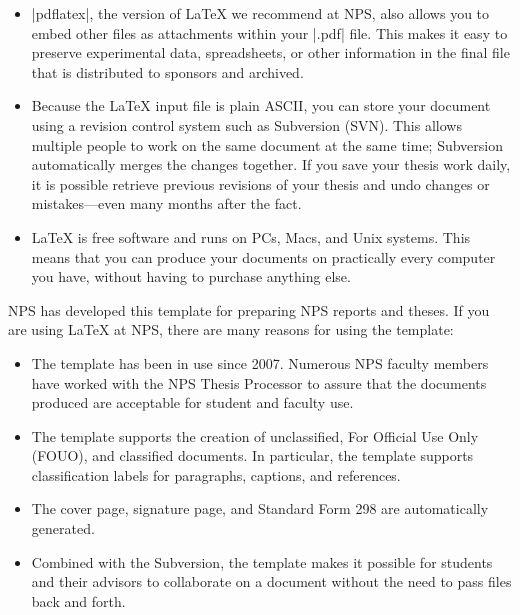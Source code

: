 \begin{itemize}
\item |pdflatex|, the version of \LaTeX{} we recommend at NPS, also allows you
  to embed other files as attachments within your |.pdf| file. This makes it
  easy to preserve  experimental data, spreadsheets, or other information in
  the final file that is distributed to sponsors and archived. 

\item Because the \LaTeX{} input file is plain ASCII, you can store your
  document using a revision control system such as Subversion
  (SVN)\cite{subversion}. This allows multiple people to work on the same
  document at the same time; Subversion automatically merges the changes
  together.  If you save your thesis work daily, it is possible retrieve
  previous revisions of your thesis and undo changes or mistakes---even many
  months after the fact.

\item \LaTeX{} is free software and runs on PCs, Macs, and Unix systems. This
  means that you can produce your documents on practically every computer you
  have, without having to purchase anything else.

\end{itemize}

NPS has developed this template for preparing NPS reports and theses. If you
are using \LaTeX{} at NPS, there are many reasons for using the template:

\begin{itemize}

\item The template has been in use since 2007. Numerous NPS faculty members
  have worked with the NPS Thesis Processor to assure that the documents
  produced are acceptable for student and faculty use.

\item The template supports the creation of unclassified, For Official Use Only
  (FOUO), and classified documents. In particular, the template supports
  classification labels for paragraphs, captions, and references.

\item The cover page, signature page, and Standard Form 298 are automatically
  generated.

\item Combined with the Subversion, the template makes it possible for students
  and their advisors to collaborate on a document without the need to pass
  files back and forth. 

\end{itemize}


